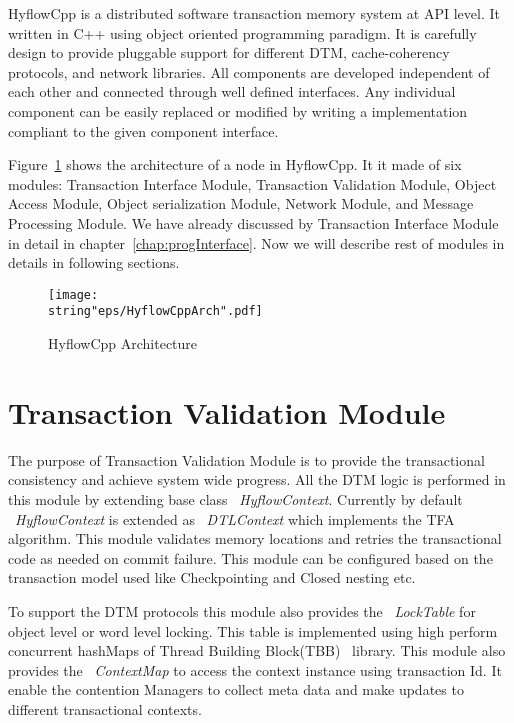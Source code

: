 \documentclass[12pt,english]{report}
\begin{document}
HyflowCpp is a distributed software transaction memory system at API level. It written in C++ using object oriented programming paradigm. It is carefully design to provide pluggable support for different DTM, cache-coherency protocols, and network libraries. All components are developed independent of each other and connected through well defined interfaces. Any individual component can be easily replaced or modified by writing a implementation compliant to the given component interface. 

Figure~\ref{Fig:HyflowCppArch} shows the architecture of a node in HyflowCpp. It it made of six modules: Transaction Interface Module, Transaction Validation Module, Object Access Module, Object serialization Module, Network Module, and Message Processing Module. We have already discussed by Transaction Interface Module in detail in chapter~\ref{chap:progInterface}. Now we will describe rest of modules in details in following sections.

\begin{figure}
\begin{minipage}[b]{0.9\linewidth}\centering
\centering \texttt{[image: \\string"eps/HyflowCppArch".pdf]}
\caption{HyflowCpp Architecture}
\label{Fig:HyflowCppArch}
\end{minipage}
\end{figure}

\section{Transaction Validation Module}

The purpose of Transaction Validation Module is to provide the transactional consistency and achieve system wide progress. All the DTM logic is performed in this module by extending base class ~\emph{HyflowContext}. Currently by default ~\emph{HyflowContext} is extended as ~\emph{DTLContext} which implements the TFA algorithm. This module validates memory locations and retries the transactional code as needed on commit failure. This module can be configured based on the transaction model used like Checkpointing and Closed nesting etc. 

To support the DTM protocols this module also provides the ~\emph{LockTable} for object level or word level locking. This table is implemented using high perform concurrent hashMaps of Thread Building Block(TBB)~\cite{willhalm2008putting} library. This module also provides the ~\emph{ContextMap} to access the context instance using transaction Id. It enable the contention Managers to collect meta data and make updates to different transactional contexts.
\end{document}
